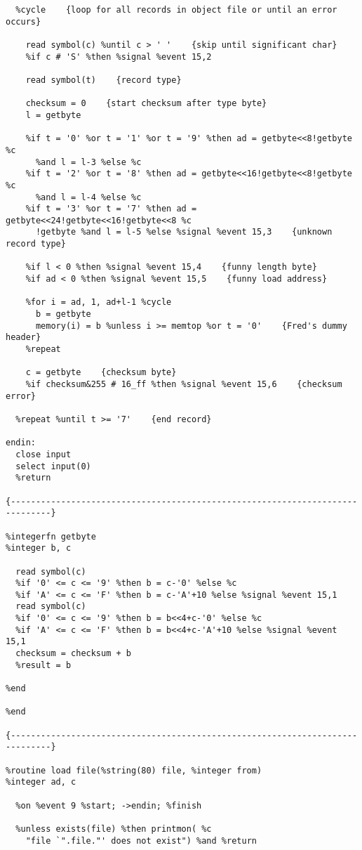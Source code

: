 \begin{verbatim}
  %cycle    {loop for all records in object file or until an error occurs}

    read symbol(c) %until c > ' '    {skip until significant char}
    %if c # 'S' %then %signal %event 15,2

    read symbol(t)    {record type}

    checksum = 0    {start checksum after type byte}
    l = getbyte

    %if t = '0' %or t = '1' %or t = '9' %then ad = getbyte<<8!getbyte %c
      %and l = l-3 %else %c
    %if t = '2' %or t = '8' %then ad = getbyte<<16!getbyte<<8!getbyte %c
      %and l = l-4 %else %c
    %if t = '3' %or t = '7' %then ad = getbyte<<24!getbyte<<16!getbyte<<8 %c
      !getbyte %and l = l-5 %else %signal %event 15,3    {unknown record type}

    %if l < 0 %then %signal %event 15,4    {funny length byte}
    %if ad < 0 %then %signal %event 15,5    {funny load address}

    %for i = ad, 1, ad+l-1 %cycle
      b = getbyte
      memory(i) = b %unless i >= memtop %or t = '0'    {Fred's dummy header}
    %repeat

    c = getbyte    {checksum byte}
    %if checksum&255 # 16_ff %then %signal %event 15,6    {checksum error}

  %repeat %until t >= '7'    {end record}

endin:
  close input
  select input(0)    
  %return

{------------------------------------------------------------------------------}

%integerfn getbyte
%integer b, c

  read symbol(c)
  %if '0' <= c <= '9' %then b = c-'0' %else %c
  %if 'A' <= c <= 'F' %then b = c-'A'+10 %else %signal %event 15,1
  read symbol(c)
  %if '0' <= c <= '9' %then b = b<<4+c-'0' %else %c
  %if 'A' <= c <= 'F' %then b = b<<4+c-'A'+10 %else %signal %event 15,1
  checksum = checksum + b
  %result = b

%end

%end

{------------------------------------------------------------------------------}

%routine load file(%string(80) file, %integer from)
%integer ad, c

  %on %event 9 %start; ->endin; %finish

  %unless exists(file) %then printmon( %c
    "file `".file."' does not exist") %and %return


\end{verbatim}
